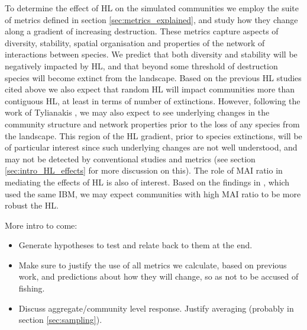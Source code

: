 To determine the effect of HL on the simulated communities we employ the suite of metrics defined in section \ref{sec:metrics_explained}, and study how they change along a gradient of increasing destruction. These metrics capture aspects of diversity, stability, spatial organisation and properties of the network of interactions between species. We predict that both diversity and stability will be negatively impacted by HL, and that beyond some threshold of destruction species will become extinct from the landscape. Based on the previous HL studies cited above we also expect that random HL will impact communities more than contiguous HL, at least in terms of number of extinctions. However, following the work of Tylianakis \cite{tylianakis2007habitat}, we may also expect to see underlying changes in the community structure and network properties prior to the loss of any species from the landscape. This region of the HL gradient, prior to species extinctions, will be of particular interest since such underlying changes are not well understood, and may not be detected by conventional studies and metrics (see section \ref{sec:intro_HL_effects} for more discussion on this). The role of MAI ratio in mediating the effects of HL is also of interest. Based on the findings in \cite{lurgi2015effects}, which used the same IBM, we may expect communities with high MAI ratio to be more robust the HL.





More intro to come:

\begin{itemize}
	\item Generate hypotheses to test and relate back to them at the end. 
	
	\item Make sure to justify the use of all metrics we calculate, based on previous work, and predictions about how they will change, so as not to be accused of fishing. 

	\item Discuss aggregate/community level response. Justify averaging (probably in section \ref{sec:sampling}).
\end{itemize}



